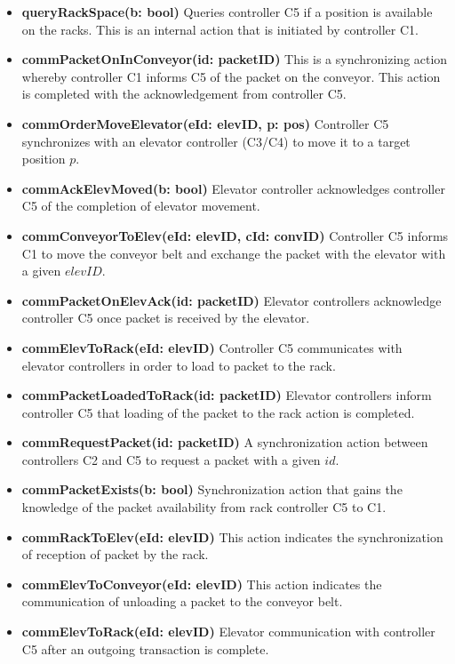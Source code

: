 \begin{itemize}
\item \textbf{queryRackSpace(b: bool)}
Queries controller C5 if a position is available on the racks. This is an internal action that is initiated by controller C1.

\item \textbf{commPacketOnInConveyor(id: packetID)}
This is a synchronizing action whereby controller C1 informs C5 of the packet on the conveyor. This action is completed with the acknowledgement from controller C5.

\item \textbf{commOrderMoveElevator(eId: elevID, p: pos)}
Controller C5 synchronizes with an elevator controller (C3/C4) to move it to a target position $p$.

\item \textbf{commAckElevMoved(b: bool)}
Elevator controller acknowledges controller C5 of the completion of elevator movement.

\item \textbf{commConveyorToElev(eId: elevID, cId: convID)}
Controller C5 informs C1 to move the conveyor belt and exchange the packet with the elevator with a given $elevID$.

\item \textbf{commPacketOnElevAck(id: packetID)}
Elevator controllers acknowledge controller C5 once packet is received by the elevator.

\item \textbf{commElevToRack(eId: elevID)}
Controller C5 communicates with elevator controllers in order to load to packet to the rack.

\item \textbf{commPacketLoadedToRack(id: packetID)}
Elevator controllers inform controller C5 that loading of the packet to the rack action is completed.

\item \textbf{commRequestPacket(id: packetID)}
A synchronization action between controllers C2 and C5 to request a packet with a given $id$.

\item \textbf{commPacketExists(b: bool)}
Synchronization action that gains the knowledge of the packet availability from rack controller C5 to C1.

\item \textbf{commRackToElev(eId: elevID)}
This action indicates the synchronization of reception of packet by the rack.

\item \textbf{commElevToConveyor(eId: elevID)}
This action indicates the communication of unloading a packet to the conveyor belt.

\item \textbf{commElevToRack(eId: elevID)}
Elevator communication with controller C5 after an outgoing transaction is complete.
\end{itemize}

